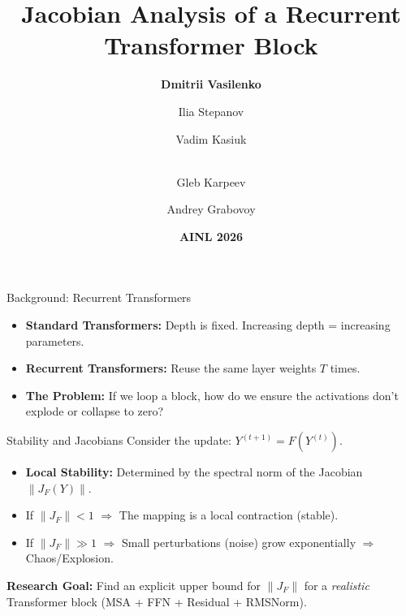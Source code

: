 \documentclass[aspectratio=169, 11pt]{beamer}
\title{\LARGE \textbf{Jacobian Analysis of a Recurrent\\ Transformer Block}}
\author{\vspace{1em} \textbf{Dmitrii Vasilenko} \and Ilia Stepanov \and Vadim Kasiuk \and \\ Gleb Karpeev \and Andrey Grabovoy}
\institute{\vspace{0.5em} \textit{Moscow Institute of Physics and Technology}}
\date{\vspace{1em} \textcolor{miptblue}{\textbf{AINL 2026}}}
\newcommand{\norm}[1]{\left\|#1\right\|}
\newcommand{\JF}{J_F}
\begin{document}
\begin{frame}[plain]
    \titlepage
\end{frame}

\begin{frame}{Background: Recurrent Transformers}
    \begin{itemize}
        \item \textbf{Standard Transformers:} Depth is fixed. Increasing depth = increasing parameters.
        \item \textbf{Recurrent Transformers:} Reuse the same layer weights $T$ times.
        \item \textbf{The Problem:} If we loop a block, how do we ensure the activations don't explode or collapse to zero?
    \end{itemize}
\end{frame}

\begin{frame}{Stability and Jacobians}
    Consider the update: $Y^{(t+1)} = F(Y^{(t)})$.
    \vspace{1em}
    \begin{itemize}
        \item \textbf{Local Stability:} Determined by the spectral norm of the Jacobian $\norm{\JF(Y)}$.
        \item If $\norm{\JF} < 1$ $\Rightarrow$ The mapping is a local contraction (stable).
        \item If $\norm{\JF} \gg 1$ $\Rightarrow$ Small perturbations (noise) grow exponentially $\Rightarrow$ Chaos/Explosion.
    \end{itemize}
    \vspace{1em}
    \textbf{Research Goal:} Find an explicit upper bound for $\norm{\JF}$ for a \textit{realistic} Transformer block (MSA + FFN + Residual + RMSNorm).
\end{frame}
\end{document}
